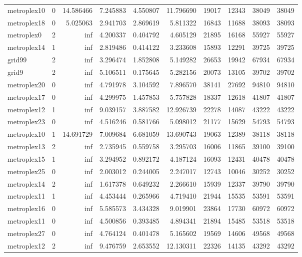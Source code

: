 \begin{longtable}{|l|r|r|r|r|r|r|r|r|r|}
metroplex10 & 0 & 14.586466 & 7.245883 & 4.550807 & 11.796690 & 19017 & 12343 & 38049 & 38049 \\
metroplex18 & 0 & 5.025063 & 2.941703 & 2.869619 & 5.811322 & 16843 & 11688 & 38093 & 38093 \\
metroplex0 & 2 & inf & 4.200337 & 0.404792 & 4.605129 & 21895 & 16168 & 55927 & 55927 \\
metroplex14 & 1 & inf & 2.819486 & 0.414122 & 3.233608 & 15893 & 12291 & 39725 & 39725 \\
grid99 & 2 & inf & 3.296474 & 1.852808 & 5.149282 & 26653 & 19942 & 67934 & 67934 \\
grid9 & 2 & inf & 5.106511 & 0.175645 & 5.282156 & 20073 & 13105 & 39702 & 39702 \\
metroplex20 & 0 & inf & 4.791978 & 3.104592 & 7.896570 & 38141 & 27692 & 94810 & 94810 \\
metroplex17 & 0 & inf & 4.299975 & 1.457853 & 5.757828 & 18337 & 12618 & 41807 & 41807 \\
metroplex12 & 1 & inf & 9.039157 & 3.887582 & 12.926739 & 22278 & 14087 & 43222 & 43222 \\
metroplex23 & 0 & inf & 4.516246 & 0.581766 & 5.098012 & 21177 & 15629 & 54793 & 54793 \\
metroplex10 & 1 & 14.691729 & 7.009684 & 6.681059 & 13.690743 & 19063 & 12389 & 38118 & 38118 \\
metroplex13 & 2 & inf & 2.735945 & 0.559758 & 3.295703 & 16006 & 11865 & 39100 & 39100 \\
metroplex15 & 1 & inf & 3.294952 & 0.892172 & 4.187124 & 16093 & 12431 & 40478 & 40478 \\
metroplex25 & 0 & inf & 2.003012 & 0.244005 & 2.247017 & 12743 & 10046 & 30252 & 30252 \\
metroplex14 & 2 & inf & 1.617378 & 0.649232 & 2.266610 & 15939 & 12337 & 39790 & 39790 \\
metroplex11 & 1 & inf & 4.453444 & 0.265966 & 4.719410 & 21944 & 15535 & 53591 & 53591 \\
metroplex16 & 0 & inf & 5.585573 & 3.434328 & 9.019901 & 23864 & 17730 & 60972 & 60972 \\
metroplex11 & 0 & inf & 4.500856 & 0.393485 & 4.894341 & 21894 & 15485 & 53518 & 53518 \\
metroplex27 & 0 & inf & 4.764124 & 0.401478 & 5.165602 & 19569 & 14606 & 49568 & 49568 \\
metroplex12 & 2 & inf & 9.476759 & 2.653552 & 12.130311 & 22326 & 14135 & 43292 & 43292 \\

\end{longtable}
